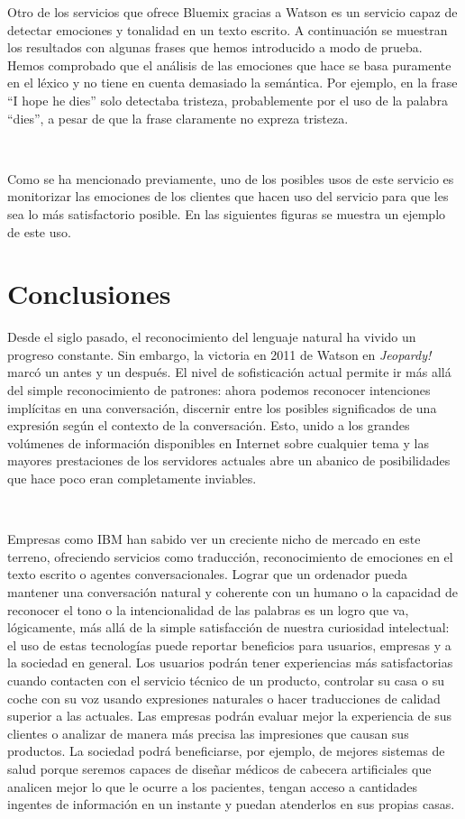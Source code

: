 \documentclass[paper=a4, fontsize=10pt]{scrartcl} %
\numberwithin{equation}{section} %
\numberwithin{figure}{section} %
\numberwithin{table}{section} %
\begin{document}
Otro de los servicios que ofrece Bluemix gracias a Watson es un servicio capaz de detectar emociones y tonalidad en un texto escrito. A continuación se muestran los resultados con algunas frases que hemos introducido a modo de prueba. Hemos comprobado que el análisis de las emociones que hace se basa puramente en el léxico y no tiene en cuenta demasiado la semántica. Por ejemplo, en la frase ``I hope he dies'' solo detectaba tristeza, probablemente por el uso de la palabra ``dies'', a pesar de que la frase claramente no expreza tristeza.

\

Como se ha mencionado previamente, uno de los posibles usos de este servicio es monitorizar las emociones de los clientes que hacen uso del servicio para que les sea lo más satisfactorio posible. En las siguientes figuras se muestra un ejemplo de este uso.

\section{Conclusiones}

Desde el siglo pasado, el reconocimiento del lenguaje natural ha vivido un progreso constante. Sin embargo, la victoria en 2011 de Watson en \textit{Jeopardy!} marcó un antes y un después. El nivel de sofisticación actual permite ir más allá del simple reconocimiento de patrones: ahora podemos reconocer intenciones implícitas en una conversación, discernir entre los posibles significados de una expresión según el contexto de la conversación. Esto, unido a los grandes volúmenes de información disponibles en Internet sobre cualquier tema y las mayores prestaciones de los servidores actuales abre un abanico de posibilidades que hace poco eran completamente inviables. 

\

Empresas como IBM han sabido ver un creciente nicho de mercado en este terreno, ofreciendo servicios como traducción, reconocimiento de emociones en el texto escrito o agentes conversacionales. Lograr que un ordenador pueda mantener una conversación natural y coherente con un humano o la capacidad de reconocer el tono o la intencionalidad de las palabras es un logro que va, lógicamente, más allá de la simple satisfacción de nuestra curiosidad intelectual: el uso de estas tecnologías puede reportar beneficios para usuarios, empresas y a la sociedad en general. Los usuarios podrán tener experiencias más satisfactorias cuando contacten con el servicio técnico de un producto, controlar su casa o su coche con su voz usando expresiones naturales o hacer traducciones de calidad superior a las actuales. Las empresas podrán evaluar mejor la experiencia de sus clientes o analizar de manera más precisa las impresiones que causan sus productos. La sociedad podrá beneficiarse, por ejemplo, de mejores sistemas de salud porque seremos capaces de diseñar médicos de cabecera artificiales que analicen mejor lo que le ocurre a los pacientes, tengan acceso a cantidades ingentes de información en un instante y puedan atenderlos en sus propias casas.
\end{document}
